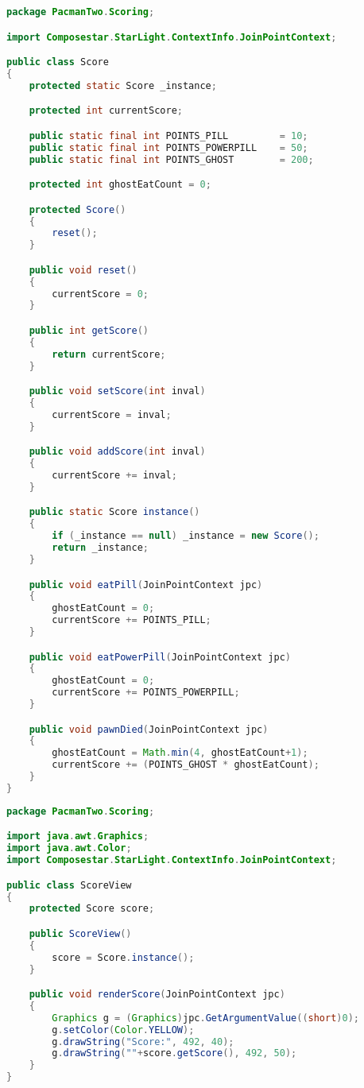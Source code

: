 \begin{lstlisting}[style=floatlisting,language=Java,%
                   caption={Implementation of class \expandafter{\lstinline[style=inline]|Score|}},%
                   label={lst:score_impl}]
package PacmanTwo.Scoring;

import Composestar.StarLight.ContextInfo.JoinPointContext;

public class Score
{
	protected static Score _instance;

	protected int currentScore;

	public static final int POINTS_PILL			= 10;
	public static final int POINTS_POWERPILL	= 50;
	public static final int POINTS_GHOST		= 200;

	protected int ghostEatCount = 0;

	protected Score()
	{
		reset();
	}

	public void reset()
	{
		currentScore = 0;
	}

	public int getScore()
	{
		return currentScore;
	}

	public void setScore(int inval)
	{
		currentScore = inval;
	}

	public void addScore(int inval)
	{
		currentScore += inval;
	}

	public static Score instance()
	{
		if (_instance == null) _instance = new Score();
		return _instance;
	}

	public void eatPill(JoinPointContext jpc)
	{
		ghostEatCount = 0;
		currentScore += POINTS_PILL;
	}

	public void eatPowerPill(JoinPointContext jpc)
	{
		ghostEatCount = 0;
		currentScore += POINTS_POWERPILL;
	}

	public void pawnDied(JoinPointContext jpc)
	{
		ghostEatCount = Math.min(4, ghostEatCount+1);
		currentScore += (POINTS_GHOST * ghostEatCount);
	}
}
\end{lstlisting}

\begin{lstlisting}[style=floatlisting,language=Java,%
                   caption={Implementation of class \expandafter{\lstinline[style=inline]|ScoreView|}},%
                   label={lst:scoreview_impl}]
package PacmanTwo.Scoring;

import java.awt.Graphics;
import java.awt.Color;
import Composestar.StarLight.ContextInfo.JoinPointContext;

public class ScoreView
{
	protected Score score;

	public ScoreView()
	{
		score = Score.instance();
	}

	public void renderScore(JoinPointContext jpc)
	{
		Graphics g = (Graphics)jpc.GetArgumentValue((short)0);
		g.setColor(Color.YELLOW);
		g.drawString("Score:", 492, 40);
		g.drawString(""+score.getScore(), 492, 50);
	}
}
\end{lstlisting}

